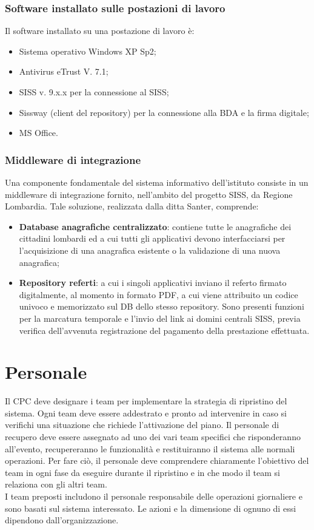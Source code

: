 \documentclass[12pt, a4paper, titlepage]{report}
\begin{document}
	\subsubsection{Software installato sulle postazioni di lavoro}
	
	Il software installato su una postazione di lavoro è:
	\begin{itemize}
		\item Sistema operativo Windows XP Sp2;
		\item Antivirus eTrust V. 7.1;
		\item SISS v. 9.x.x per la connessione al SISS;
		\item Sissway (client del repository) per la connessione alla BDA e la firma digitale;
		\item MS Office.
	\end{itemize}
	\newpage
	\subsubsection{Middleware di integrazione}
	
	Una componente fondamentale del sistema informativo dell'istituto consiste in un middleware di integrazione fornito, nell'ambito del progetto SISS, da Regione Lombardia. Tale soluzione, realizzata dalla ditta Santer, comprende:
	\begin{itemize}
		\item \textbf{Database anagrafiche centralizzato}: contiene tutte le anagrafiche dei cittadini lombardi ed a cui tutti gli applicativi devono interfacciarsi per l'acquisizione di una anagrafica esistente o la validazione di una nuova anagrafica;
		\item \textbf{Repository referti}:  a cui i singoli applicativi inviano il referto firmato digitalmente, al momento in formato PDF, a cui viene attribuito un codice univoco e memorizzato sul DB dello stesso repository. Sono presenti funzioni per la marcatura temporale e l'invio del link ai domini centrali SISS, previa verifica dell'avvenuta registrazione del pagamento della prestazione effettuata.
	\end{itemize}
	
	\newpage
	
	\section{Personale} \label{personale}
	
	Il CPC deve designare i team per implementare la strategia di ripristino del sistema. Ogni team deve essere addestrato e pronto ad intervenire in caso si verifichi una situazione che richiede l'attivazione del piano.
	Il personale di recupero deve essere assegnato ad uno dei vari team specifici che risponderanno all'evento, recupereranno le funzionalità e restituiranno il sistema alle normali operazioni. Per fare ciò, il personale deve comprendere chiaramente l'obiettivo del team in ogni fase da eseguire durante il ripristino e in che modo il team si relaziona con gli altri team.\\
	I team preposti includono il personale responsabile delle operazioni giornaliere e sono basati sul sistema interessato. Le azioni e la dimensione di ognuno di essi dipendono dall'organizzazione.
	
\end{document}
